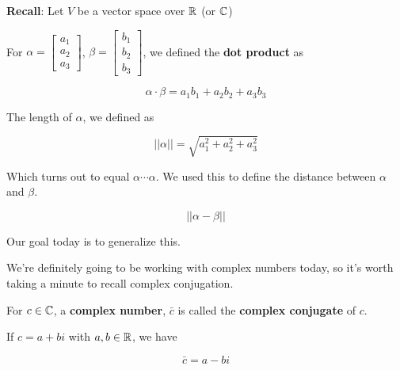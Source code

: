 \documentclass[12pt]{article}
\begin{document}
  {\bf Recall}: Let $V$ be a vector space over ${\mathbb R}$ (or ${\mathbb C}$)

  \Definition{}
  {
    For $\alpha = \begin{bmatrix} a_1 \\ a_2 \\ a_3 \end{bmatrix}$, $\beta =
    \begin{bmatrix} b_1 \\ b_2 \\ b_3 \end{bmatrix}$, we defined the {\bf dot
    product} as

    \[
      \alpha \cdot \beta = a_1 b_1 + a_2 b_2 + a_3 b_3
    \]
  }

  The length of $\alpha$, we defined as

  \[
    ||\alpha|| = \sqrt{a_1^2 + a_2^2 + a_3^2}
  \]

  Which turns out to equal $\alpha \cdots \alpha$. We used this to define the
  distance between $\alpha$ and $\beta$.

  \[
    ||\alpha - \beta||
  \]

  Our goal today is to generalize this.

  We're definitely going to be working with complex numbers today, so it's worth
  taking a minute to recall complex conjugation.

  \Definition{}
  {
    For $c \in {\mathbb C}$, a {\bf complex number}, $\bar c$ is called the {\bf complex
    conjugate} of $c$.

    If $c = a + bi$ with $a, b \in {\mathbb R}$, we have 

    \[
      \bar c = a - bi
    \]
  }

\end{document}
